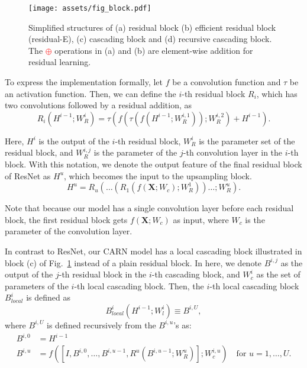 \documentclass[runningheads]{llncs}
\newcommand{\red}[1]{\textcolor{red}{#1}}
\begin{document}
\begin{figure}[tbp]
    \centering
    \texttt{[image: assets/fig\_block.pdf]}
    \caption{Simplified structures of (a) residual block (b) efficient residual block (residual-E), (c) cascading block and (d) recursive cascading block. The \red{$\oplus$} operations in (a) and (b) are element-wise addition for residual learning.}
    \label{fig:block}
\end{figure}

To express the implementation formally, let $f$ be a convolution function and $\tau$ be an activation function. Then, we can define the $i$-th residual block $R_i$, which has two convolutions followed by a residual addition, as
\begin{equation}\label{eq:resblock}
R_i(H^{i-1};W_R^i) = \tau( f(\tau(f(H^{i-1};W_R^{i,1}));W_R^{i,2}) + H^{i-1}).
\end{equation}

Here, $H^i$ is the output of the $i$-th residual block, $W_R^i$ is the parameter set of the residual block, and $W_R^{i,j}$ is the parameter of the $j$-th convolution layer in the $i$-th block. With this notation, we denote the output feature of the final residual block of ResNet as $H^u$, which becomes the input to the upsampling block.
\begin{equation}\label{eq:resnet}
H^u = R_u\left(\dots\left(R_1\left(f\left(\boldsymbol{X};W_c\right);W_R^1\right)\right)\dots;W_R^u\right).
\end{equation}

Note that because our model has a single convolution layer before each residual block, the first residual block gets $f(\boldsymbol{X}; W_c)$ as input, where $W_c$ is the parameter of the convolution layer.

In contrast to ResNet, our CARN model has a local cascading block illustrated in block (c) of Fig.~\ref{fig:block} instead of a plain residual block. In here, we denote $B^{i, j}$ as the output of the $j$-th residual block in the $i$-th cascading block, and $W_c^i$ as the set of parameters of the $i$-th local cascading block. Then, the $i$-th local cascading block $B_{local}^{i}$ is defined as
\begin{equation}\label{eq:local_carn}
B_{local}^i\left(H^{i-1};W_l^i\right) \equiv B^{i, U},
\end{equation}
where $B^{i,U}$ is defined recursively from the $B^{i,u}$'s as:
\begin{align*}
B^{i,0} &= H^{i-1} \nonumber \\
B^{i,u} &= f\left(\left[I, B^{i,0},\dots,B^{i,u-1},R^{u}\left(B^{i,u-1};W_R^{u}\right)\right];W_c^{i,u}\right) \quad\text{for $u=1,\dots,U$.}
\end{align*}
\end{document}
